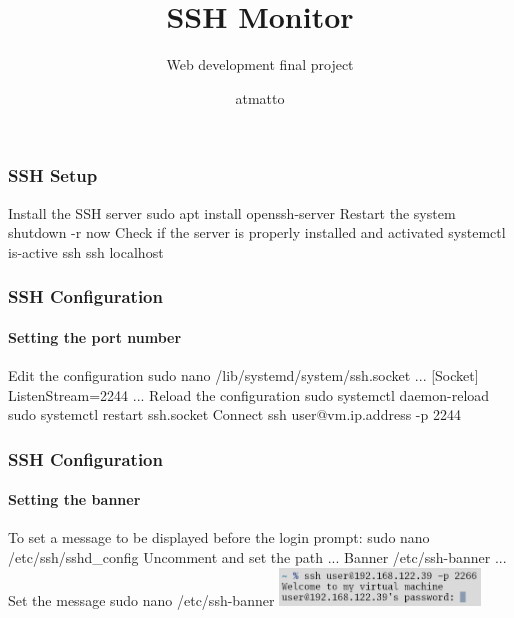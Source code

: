 \documentclass{beamer}
\title{SSH Monitor}
\subtitle{Web development final project}
\author{atmatto}
\date{}
\newenvironment{code}%
   {\snugshade\verbatim}%
   {\endverbatim\endsnugshade}
\begin{document}
\frame{\titlepage}

\begin{frame}[fragile]
	\frametitle{SSH Setup}
	Install the SSH server
	\begin{code}sudo apt install openssh-server\end{code}
	Restart the system
	\begin{code}shutdown -r now\end{code}
	Check if the server is properly installed and activated
	\begin{code}
		systemctl is-active ssh
		ssh localhost
	\end{code}
\end{frame}


\begin{frame}[fragile]
	\frametitle{SSH Configuration}
	\framesubtitle{Setting the port number}
	Edit the configuration
	\begin{code}
		sudo nano /lib/systemd/system/ssh.socket
		...
		[Socket]
		ListenStream=2244
		...
	\end{code}
	Reload the configuration
	\begin{code}
		sudo systemctl daemon-reload
		sudo systemctl restart ssh.socket
	\end{code}
	Connect
	\begin{code}ssh user@vm.ip.address -p 2244\end{code}
\end{frame}

\begin{frame}[fragile]
	\frametitle{SSH Configuration}
	\framesubtitle{Setting the banner}
	To set a message to be displayed before the login prompt:
	\begin{code}
		sudo nano /etc/ssh/sshd_config
	\end{code}
	Uncomment and set the path
	\begin{code}
		...
		Banner /etc/ssh-banner
		...
	\end{code}
	Set the message
	\begin{code}
		sudo nano /etc/ssh-banner
	\end{code}
	\includegraphics[width=0.4\textwidth]{banner.png}
\end{frame}
\end{document}
